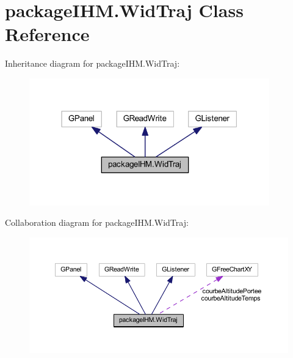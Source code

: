 \hypertarget{classpackage_i_h_m_1_1_wid_traj}{}\section{package\+I\+H\+M.\+Wid\+Traj Class Reference}
\label{classpackage_i_h_m_1_1_wid_traj}


Inheritance diagram for package\+I\+H\+M.\+Wid\+Traj\+:
\nopagebreak
\begin{figure}[H]
\begin{center}
\leavevmode
\includegraphics[width=295pt]{classpackage_i_h_m_1_1_wid_traj__inherit__graph}
\end{center}
\end{figure}


Collaboration diagram for package\+I\+H\+M.\+Wid\+Traj\+:
\nopagebreak
\begin{figure}[H]
\begin{center}
\leavevmode
\includegraphics[width=350pt]{classpackage_i_h_m_1_1_wid_traj__coll__graph}
\end{center}
\end{figure}
